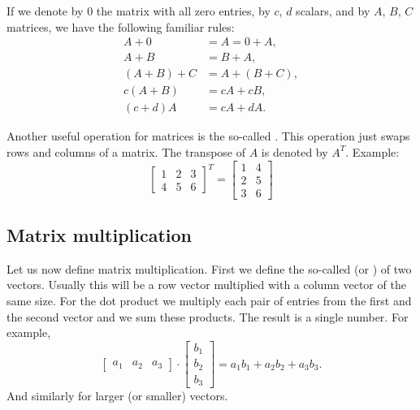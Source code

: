 If we denote by 0 the matrix with all zero entries, by
$c$, $d$ scalars, and by $A$, $B$, $C$ matrices, we
have the following familiar rules:
\begin{align*}
A + 0 & = A = 0 + A , \\
A + B & = B + A , \\
(A + B) + C & = A + (B + C) , \\
c(A+B) & = cA+cB, \\
(c+d)A & = cA + dA.
\end{align*}

Another useful operation for matrices is the so-called
\emph{}.  This operation just swaps rows and columns of a
matrix.
The transpose of $A$ is denoted by $A^T$.  Example:
\begin{equation*}
\begin{bmatrix}
1 & 2 & 3 \\
4 & 5 & 6
\end{bmatrix}^T =
\begin{bmatrix}
1 & 4 \\
2 & 5 \\
3 & 6 
\end{bmatrix}
\end{equation*}

\subsection{Matrix multiplication}

Let us now define matrix multiplication.  First we define the so-called
\emph{} (or \emph{}) of two vectors.
Usually this will be a row vector multiplied
with a column vector of the same size.  For the dot product we multiply
each pair of entries from the first and the second vector and we sum these
products.  The result is a single number.
For example,
\begin{equation*}
\begin{bmatrix}
a_1 & a_2 & a_3
\end{bmatrix}
\cdot
\begin{bmatrix}
b_1 \\
b_2 \\
b_3
\end{bmatrix}
= a_1 b_1 + a_2 b_2 + a_3 b_3 .
\end{equation*}
And similarly for larger (or smaller) vectors.

